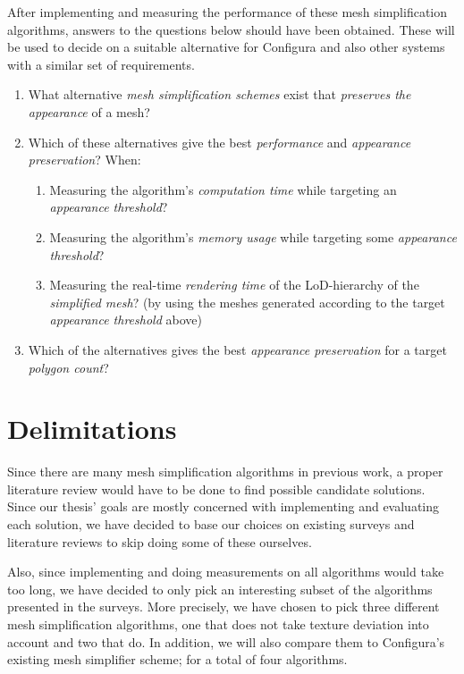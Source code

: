 After implementing and measuring the performance of these mesh simplification algorithms, answers to the questions below should have been obtained. These will be used to decide on a suitable alternative for Configura and also other systems with a similar set of requirements.

\begin{enumerate}
\item What alternative \emph{mesh simplification schemes} exist that \emph{preserves the appearance} of a mesh?

\item{Which of these alternatives give the best \emph{performance} and \emph{appearance preservation}? When:
  \begin{enumerate}
  \item Measuring the algorithm's \emph{computation time} while targeting an \emph{appearance threshold}?
  \item Measuring the algorithm's \emph{memory usage} while targeting some \emph{appearance threshold}?
  \item Measuring the real-time \emph{rendering time} of the LoD-hierarchy of the \emph{simplified mesh}?
        (by using the meshes generated according to the target \emph{appearance threshold} above)
  \end{enumerate}
}
\item Which of the alternatives gives the best \emph{appearance preservation} for a target \emph{polygon count}?
\end{enumerate}


\section{Delimitations}
\label{sec:delimitations}

Since there are many mesh simplification algorithms in previous work, a proper literature review would have to be done to find possible candidate solutions. Since our thesis' goals are mostly concerned with implementing and evaluating each solution, we have decided to base our choices on existing surveys and literature reviews to skip doing some of these ourselves.

Also, since implementing and doing measurements on all algorithms would take too long, we have decided to only pick an interesting subset of the algorithms presented in the surveys. More precisely, we have chosen to pick three different mesh simplification algorithms, one that does not take texture deviation into account and two that do. In addition, we will also compare them to Configura's existing mesh simplifier scheme; for a total of four algorithms.

